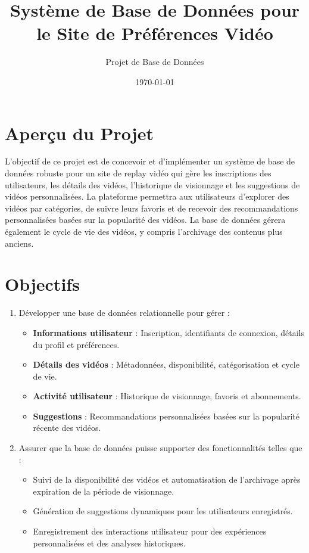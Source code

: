 \documentclass{article}
\begin{document}
\title{Système de Base de Données pour le Site de Préférences Vidéo}
\author{Projet de Base de Données}
\date{\today}

\maketitle

\tableofcontents
\newpage

\section{Aperçu du Projet}

L'objectif de ce projet est de concevoir et d'implémenter un système de base de données robuste pour un site de replay vidéo qui gère les inscriptions des utilisateurs, les détails des vidéos, l'historique de visionnage et les suggestions de vidéos personnalisées. La plateforme permettra aux utilisateurs d'explorer des vidéos par catégories, de suivre leurs favoris et de recevoir des recommandations personnalisées basées sur la popularité des vidéos. La base de données gérera également le cycle de vie des vidéos, y compris l'archivage des contenus plus anciens.

\section{Objectifs}

\begin{enumerate}
    \item Développer une base de données relationnelle pour gérer :
    \begin{itemize}
        \item \textbf{Informations utilisateur} : Inscription, identifiants de connexion, détails du profil et préférences.
        \item \textbf{Détails des vidéos} : Métadonnées, disponibilité, catégorisation et cycle de vie.
        \item \textbf{Activité utilisateur} : Historique de visionnage, favoris et abonnements.
        \item \textbf{Suggestions} : Recommandations personnalisées basées sur la popularité récente des vidéos.
    \end{itemize}
    \item Assurer que la base de données puisse supporter des fonctionnalités telles que :
    \begin{itemize}
        \item Suivi de la disponibilité des vidéos et automatisation de l'archivage après expiration de la période de visionnage.
        \item Génération de suggestions dynamiques pour les utilisateurs enregistrés.
        \item Enregistrement des interactions utilisateur pour des expériences personnalisées et des analyses historiques.
    \end{itemize}
\end{enumerate}
\end{document}
